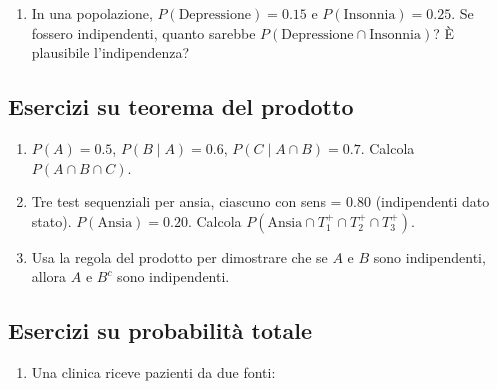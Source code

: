 \documentclass[
  letterpaper,
  DIV=11,
  numbers=noendperiod,
  oneside]{scrreprt}
\providecommand{\tightlist}{%
  \setlength{\itemsep}{0pt}\setlength{\parskip}{0pt}}
\theoremstyle{definition}
\theoremstyle{plain}
\theoremstyle{definition}
\theoremstyle{remark}
\begin{document}
\begin{tcolorbox}
\begin{enumerate}
  \begin{itemize}
  \tightlist
  \item
    \(A\) = ``Prima moneta è testa''
  \item
    \(B\) = ``Almeno una testa''
  \end{itemize}

  \begin{enumerate}
  \def\labelenumii{\alph{enumii}.}
  \tightlist
  \item
    Costruisci tabella congiunta
  \item
    Calcola \(P(A \mid B)\)
  \item
    \(A\) e \(B\) sono indipendenti?
  \end{enumerate}
\item
  In una popolazione, \(P(\text{Depressione}) = 0.15\) e
  \(P(\text{Insonnia}) = 0.25\). Se fossero indipendenti, quanto sarebbe
  \(P(\text{Depressione} \cap \text{Insonnia})\)? È plausibile
  l'indipendenza?
\end{enumerate}

\subsection{Esercizi su teorema del
prodotto}\label{esercizi-su-teorema-del-prodotto}

\begin{enumerate}
\def\labelenumi{\arabic{enumi}.}
\setcounter{enumi}{11}
\item
  \(P(A) = 0.5\), \(P(B \mid A) = 0.6\), \(P(C \mid A \cap B) = 0.7\).
  Calcola \(P(A \cap B \cap C)\).
\item
  Tre test sequenziali per ansia, ciascuno con sens = 0.80 (indipendenti
  dato stato). \(P(\text{Ansia}) = 0.20\). Calcola
  \(P(\text{Ansia} \cap T_1^+ \cap T_2^+ \cap T_3^+)\).
\item
  Usa la regola del prodotto per dimostrare che se \(A\) e \(B\) sono
  indipendenti, allora \(A\) e \(B^c\) sono indipendenti.
\end{enumerate}

\subsection{Esercizi su probabilità
totale}\label{esercizi-su-probabilituxe0-totale}

\begin{enumerate}
\def\labelenumi{\arabic{enumi}.}
\setcounter{enumi}{14}
\item
  Una clinica riceve pazienti da due fonti:


\end{enumerate}
\end{tcolorbox}
\end{document}
